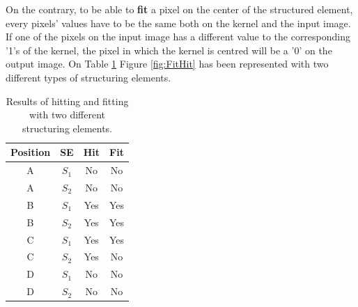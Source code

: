 On the contrary, to be able to \textbf{fit} a pixel on the center of the structured element, every pixels' values have to be the same both on the kernel and the input image. If one of the pixels on the input image has a different value to the corresponding '1's of the kernel, the pixel in which the kernel is centred will be a '0' on the output image. On Table \ref{tab:HitFitResults} Figure \ref{fig:FitHit} has been represented with two different types of structuring elements.
\begin{table}[htbp]
\centering
\begin{tabular}{|c|c|c|c|}
\hline
 \:Position\: &SE &\:\:\:Hit\:\:\: &\:\:\:Fit\:\:\: \\\hline
 \hline
 A &$S_{1}$ &No &No\\\hline
 A &$S_{2}$ &No &No\\\hline
 B &$S_{1}$ &Yes &Yes\\\hline
 B &$S_{2}$ &Yes &Yes\\\hline
 C &$S_{1}$ &Yes &Yes\\\hline
 C &$S_{2}$ &Yes &No\\\hline
 D &$S_{1}$ &No &No\\\hline
 D &$S_{2}$ &No &No\\\hline
\end{tabular}
\caption{Results of hitting and fitting with two different structuring elements.}
\label{tab:HitFitResults}
\end{table}

